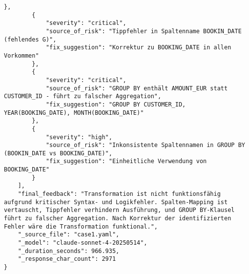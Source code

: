\begin{lstlisting}[caption={Ausgabe: Claude Sonnet 4 Anwendungsfall 1 Hauptdurchlauf},label={claude_case1_prompt1}]
        },
        {
            "severity": "critical",
            "source_of_risk": "Tippfehler in Spaltenname BOOKIN_DATE (fehlendes G)",
            "fix_suggestion": "Korrektur zu BOOKING_DATE in allen Vorkommen"
        },
        {
            "severity": "critical",
            "source_of_risk": "GROUP BY enthält AMOUNT_EUR statt CUSTOMER_ID - führt zu falscher Aggregation",
            "fix_suggestion": "GROUP BY CUSTOMER_ID, YEAR(BOOKING_DATE), MONTH(BOOKING_DATE)"
        },
        {
            "severity": "high",
            "source_of_risk": "Inkonsistente Spaltennamen in GROUP BY (BOOKIN_DATE vs BOOKING_DATE)",
            "fix_suggestion": "Einheitliche Verwendung von BOOKING_DATE"
        }
    ],
    "final_feedback": "Transformation ist nicht funktionsfähig aufgrund kritischer Syntax- und Logikfehler. Spalten-Mapping ist vertauscht, Tippfehler verhindern Ausführung, und GROUP BY-Klausel führt zu falscher Aggregation. Nach Korrektur der identifizierten Fehler wäre die Transformation funktional.",
    "_source_file": "case1.yaml",
    "_model": "claude-sonnet-4-20250514",
    "_duration_seconds": 966.935,
    "_response_char_count": 2971
}
\end{lstlisting}

